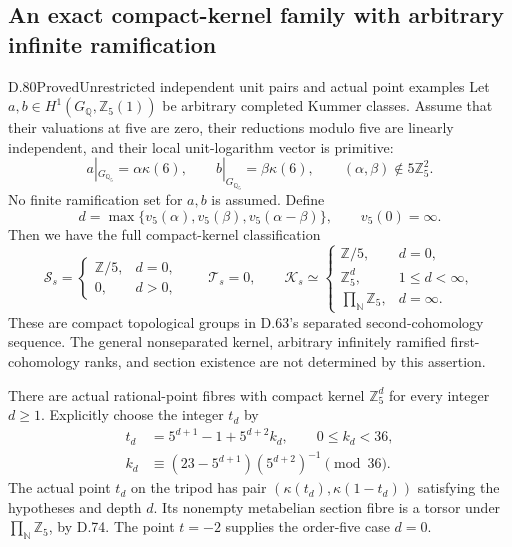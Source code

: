 \subsection{An exact compact-kernel family with arbitrary infinite ramification}

\begin{statement}{D.80}{Proved}{Unrestricted independent unit pairs and actual point examples}
Let \(a,b\in H^1(G_{\mathbb Q},\mathbb Z_5(1))\) be arbitrary
completed Kummer classes. Assume that their valuations at five
are zero, their reductions modulo five are linearly independent,
and their local unit-logarithm vector is primitive:
\[
 a|_{G_{\mathbb Q_5}}=\alpha\kappa(6),\qquad
 b|_{G_{\mathbb Q_5}}=\beta\kappa(6),\qquad
                  (\alpha,\beta)\notin5\mathbb Z_5^2.
                                                               \tag{D.80.1}
\]
No finite ramification set for \(a,b\) is assumed. Define
\[
 d=\max\{v_5(\alpha),v_5(\beta),v_5(\alpha-\beta)\},
                    \qquad v_5(0)=\infty.
                                                               \tag{D.80.2}
\]
Then we have the full compact-kernel classification
\[
 \mathcal S_s=
 \begin{cases}\mathbb Z/5,&d=0,\\0,&d>0,\end{cases}
 \qquad\mathcal T_s=0,\qquad
 \mathcal K_s\simeq
 \begin{cases}
   \mathbb Z/5,&d=0,\\
   \mathbb Z_5^d,&1\le d<\infty,\\
   \displaystyle\prod_{\mathbb N}\mathbb Z_5,&d=\infty.
 \end{cases}                                                   \tag{D.80.3}
\]
These are compact topological groups in D.63's separated
second-cohomology sequence. The general nonseparated kernel,
arbitrary infinitely ramified first-cohomology ranks, and
section existence are not determined by this assertion.

There are actual rational-point fibres with compact kernel
\(\mathbb Z_5^d\) for every integer \(d\ge1\). Explicitly choose
the integer \(t_d\) by
\[
 \begin{split}
 t_d&=5^{d+1}-1+5^{d+2}k_d,\qquad 0\le k_d<36,\\
 k_d&\equiv(23-5^{d+1})(5^{d+2})^{-1}\pmod{36}.
 \end{split}                                                   \tag{D.80.4}
\]
The actual point \(t_d\) on the tripod has pair
\((\kappa(t_d),\kappa(1-t_d))\) satisfying the hypotheses
and depth \(d\). Its nonempty metabelian section fibre is
a torsor under \(\prod_{\mathbb N}\mathbb Z_5\), by D.74.
The point \(t=-2\) supplies the order-five case \(d=0\).
\end{statement}

